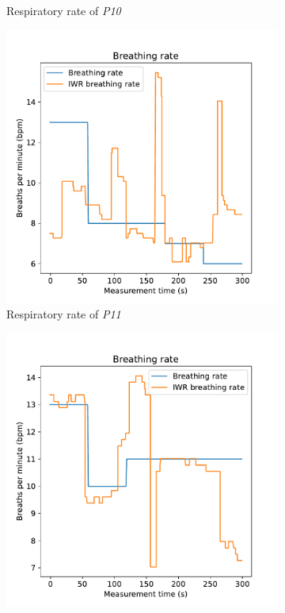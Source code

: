 \begin{figure}[t]
\begin{subfigure}{.45\textwidth}
  \caption{Respiratory rate of \emph{P10}}
  \label{fig:nick4_breath}
\end{subfigure}
\begin{subfigure}{.45\textwidth}
  \centering
  \includegraphics[width=\linewidth]{figures/validation/pascal4_breath.pdf}  
  \caption{Respiratory rate of \emph{P11}}
  \label{fig:pascal4_breath}
\end{subfigure}
\begin{subfigure}{.45\textwidth}
  \centering
  \includegraphics[width=\linewidth]{figures/validation/romy4_breath.pdf}  

\end{subfigure}
\end{figure}
